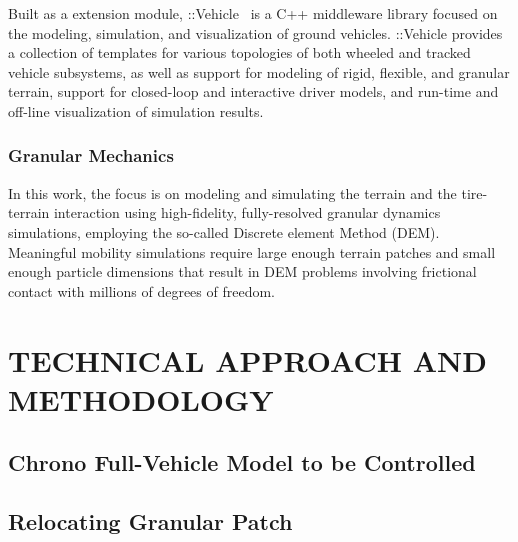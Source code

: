 \documentclass[12pt,twocolumn]{article}
\newcommand{\CHRONO}{{\sffamily{{Chrono}}}}
\newcommand{\ChronoVehicle}{{\sffamily{Chrono}}::Vehicle}
\begin{document}
Built as a {\CHRONO} extension module, {\ChronoVehicle}~\cite{TR2016-10RaduChronoVehicle} is a C++ middleware library focused on the modeling, simulation, and visualization of ground vehicles.
%
{\ChronoVehicle} provides a collection of templates for various topologies of both wheeled and tracked vehicle subsystems, as well as support for modeling of rigid, flexible, and granular terrain, support for closed-loop and interactive driver models, and run-time and off-line visualization of simulation results.




\subsubsection{Granular Mechanics }\label{sss:GranMech}

In this work, the focus is on modeling and simulating the terrain and the tire-terrain interaction using high-fidelity, fully-resolved granular dynamics simulations, employing the so-called Discrete element Method (DEM).  Meaningful mobility simulations require large enough terrain patches and small enough particle dimensions that result in DEM problems involving frictional contact with millions of degrees of freedom.



\section{TECHNICAL APPROACH AND METHODOLOGY}\label{s:methodology}

\subsection{Chrono Full-Vehicle Model to be Controlled}\label{ss:FullVehicleModel}



\subsection{Relocating Granular Patch }\label{ss:Patch}
\end{document}
